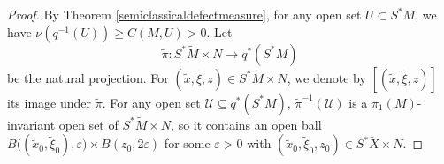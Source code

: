 \documentclass[11pt,oneside,reqno]{amsart}
\theoremstyle{definition}
\numberwithin{equation}{section}
\theoremstyle{plain}
\begin{document}
\begin{proof}
By Theorem \ref{semiclassicaldefectmeasure}, for any open set $U\subset S^*M$, we have $\nu(q^{-1}(U))\geq C(M,U)>0$.
Let 
\begin{equation*}
    \widetilde{\pi}:S^* \widetilde{M} \times N\to q^*(S^*M)
\end{equation*}
be the natural projection. For $(\widetilde{x}, \widetilde{\xi}, z) \in S^* \widetilde{M} \times N$, we denote by $[(\widetilde{x}, \widetilde{\xi}, z)]$ its image under $\widetilde{\pi}$. For any open set $\mathcal{U} \subseteq q^*(S^*M)$, $\widetilde{\pi}^{-1}(\mathcal{U})$ is a $\pi_1(M)$-invariant open set of $S^* \widetilde{M} \times N$, so it contains an open ball $B\big((\widetilde{x}_0, \widetilde{\xi}_0), \varepsilon \big) \times B(z_0, 2 \varepsilon)$ for some $\varepsilon>0$ with $(\widetilde{x}_0, \widetilde{\xi}_0, z_0) \in S^* \widetilde{X} \times N$. 


\end{proof}
\end{document}
